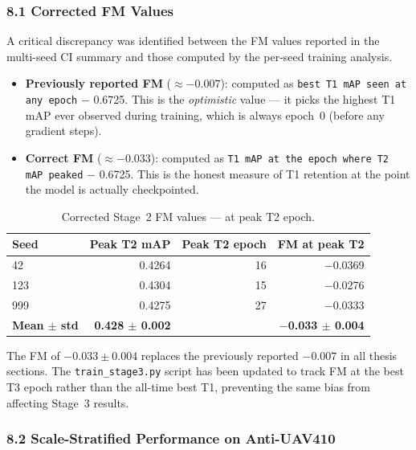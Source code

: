 \subsubsection*{8.1 Corrected FM Values}

A critical discrepancy was identified between the FM values reported
in the multi-seed CI summary and those computed by the per-seed
training analysis.

\begin{itemize}
    \item \textbf{Previously reported FM} ($\approx -0.007$): computed as
    \texttt{best T1 mAP seen at any epoch} $-$ 0.6725. This is the
    \emph{optimistic} value — it picks the highest T1 mAP ever observed
    during training, which is always epoch~0 (before any gradient steps).
    \item \textbf{Correct FM} ($\approx -0.033$): computed as
    \texttt{T1 mAP at the epoch where T2 mAP peaked} $-$ 0.6725.
    This is the honest measure of T1 retention at the point the model
    is actually checkpointed.
\end{itemize}

\begin{table}[h]
\centering
\caption{Corrected Stage~2 FM values — at peak T2 epoch.}
\label{tab:s2_fm_corrected}
\small
\begin{tabular}{lrrr}
\hline
\textbf{Seed} & \textbf{Peak T2 mAP} & \textbf{Peak T2 epoch} & \textbf{FM at peak T2} \\
\hline
42  & 0.4264 & 16 & $-$0.0369 \\
123 & 0.4304 & 15 & $-$0.0276 \\
999 & 0.4275 & 27 & $-$0.0333 \\
\hline
\textbf{Mean $\pm$ std} & \textbf{0.428 $\pm$ 0.002} & & \textbf{$-$0.033 $\pm$ 0.004} \\
\hline
\end{tabular}
\end{table}

\noindent The FM of $-0.033 \pm 0.004$ replaces the previously reported
$-0.007$ in all thesis sections. The \texttt{train\_stage3.py} script
has been updated to track FM at the best T3 epoch rather than the
all-time best T1, preventing the same bias from affecting Stage~3 results.

\subsubsection*{8.2 Scale-Stratified Performance on Anti-UAV410}

